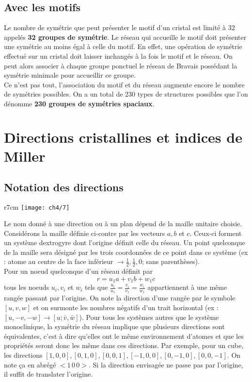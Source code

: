 	\subsection{Avec les motifs}
		Le nombre de symétrie que peut présenter le motif d'un cristal est limité à 32 appelés \textbf{32 groupes de symétrie}. Le réseau qui accueille le motif doit présenter une symétrie au moins égal à celle du motif. En effet, une opération de symétrie effectué sur un cristal doit laisser inchangés à la fois le motif et le réseau. On peut alors associer à chaque groupe ponctuel le réseau de Bravais possédant la symétrie minimale pour accueillir ce groupe. \\ Ce n'est pas tout, l'association du motif et du réseau augmente encore le nombre de symétries possibles. On a un total de 230 types de structures possibles que l'on dénomme \textbf{230 groupes de symétries spaciaux}. 
		
	
\section{Directions cristallines et indices de Miller}
	\subsection{Notation des directions}
		\begin{wrapfigure}[10]{r}{7cm}
		\vspace{-10mm}
		\texttt{[image: ch4/7]}
		\end{wrapfigure}	
		Le nom donné à une direction ou à un plan dépend de la maille unitaire choisie. Considérons la maille définie ci-contre par les vecteurs $a,b$ et $c$. Ceux-ci forment un système dextrogyre dont l'origine définit celle du réseau. Un point quelconque de la maille sera désigné par les trois coordonnées de ce point dans ce système (ex : atome au centre de la face inférieur $\rightarrow \frac{1}{2},\frac{1}{2},0$; sans parenthèses). \\
		Pour un noeud quelconque d'un réseau définit par
		\begin{equation}
			r = u_1 a + v_1b+w_1c
		\end{equation}
		tous les noeuds $u_i,v_i$ et $w_i$ tels que $\frac{u_i}{u_1} = \frac{v_i}{v_1} = \frac{w_i}{w_1}$ appartiennent à une même rangée passant par l'origine. On note la direction d'une rangée par le symbole $[u,v,w]$ et on surmonte les nombres négatifs d'un trait horizontal (ex : $[u,-v,-w] \rightarrow [u;\bar{v},\bar{w}]$). Pour tous les systèmes autres que le système monoclinique, la symétrie du réseau implique que plusieurs directions sont équivalentes, c'est à dire qu'elles ont le même environnement d'atomes et que les propriétés seront donc les même dans ces directions. Par exemple, pour un cube, les directions $[1,0,0],[0,1,0],[0,0,1],[-1,0,0],[0,-1,0],[0,0,-1]$. On note ça en abrégé $<1\, 0 \, 0>$. Si la direction envisagée ne passe pas par l'origine, il suffit de translater l'origine. 
		

